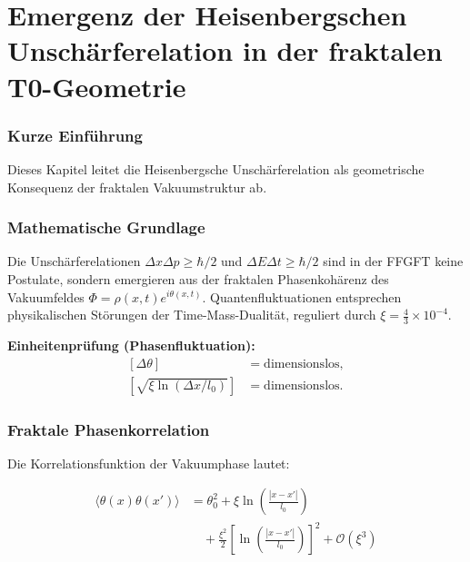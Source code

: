 \chapter{Emergenz der Heisenbergschen Unschärferelation in der fraktalen T0-Geometrie}


	
	\subsection*{Kurze Einführung}
	
	Dieses Kapitel leitet die Heisenbergsche Unschärferelation als geometrische Konsequenz der fraktalen Vakuumstruktur ab.
	
	\subsection*{Mathematische Grundlage}
	
	Die Unschärferelationen \(\Delta x \Delta p \geq \hbar/2\) und \(\Delta E \Delta t \geq \hbar/2\) sind in der FFGFT keine Postulate, sondern emergieren aus der fraktalen Phasenkohärenz des Vakuumfeldes \(\Phi = \rho(x,t) e^{i\theta(x,t)}\). Quantenfluktuationen entsprechen physikalischen Störungen der Time-Mass-Dualität, reguliert durch \(\xi = \frac{4}{3} \times 10^{-4}\).
	

	
	\textbf{Einheitenprüfung (Phasenfluktuation):}
	\[
	\begin{aligned}
		[\Delta \theta] &= \text{dimensionslos}, \\
		[\sqrt{\xi \ln(\Delta x / l_0)}] &= \text{dimensionslos}.
	\end{aligned}
	\]
	
	\subsection*{Fraktale Phasenkorrelation}
	
	Die Korrelationsfunktion der Vakuumphase lautet:
	
     \begin{equation}
	\begin{aligned}
		\langle \theta(x) \theta(x') \rangle
		&= \theta_0^2
		+ \xi \ln\!\left( \frac{|x - x'|}{l_0} \right) \\
		&\quad
		+ \frac{\xi^2}{2}
		\left[
		\ln\!\left( \frac{|x - x'|}{l_0} \right)
		\right]^2
		+ \mathcal{O}(\xi^3)
	\end{aligned}
\end{equation}
	
